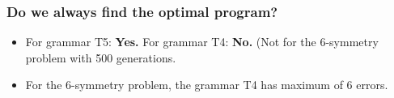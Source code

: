 \begin{frame}
\frametitle{
Do we always find the optimal program?
}
\begin{itemize}
\item For grammar T5: {\bf Yes.}
       For grammar T4: {\bf No.}
       (Not for the 6-symmetry problem with 500 generations.
\item For the 6-symmetry problem, the grammar T4 has maximum of 6 errors.
\end{itemize}
\end{frame}